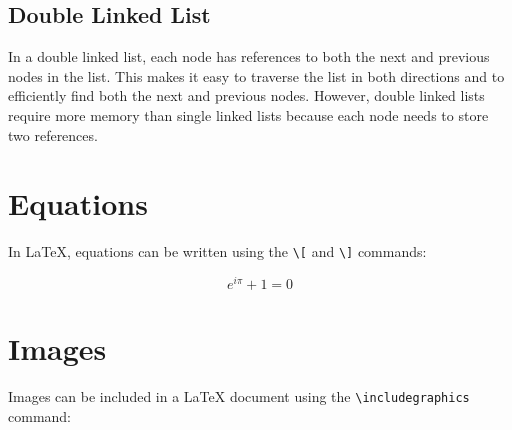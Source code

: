 \documentclass{article}
\begin{document}
\newpage
\subsection[short]{Double Linked List}


In a double linked list, each node has references to both the next and previous nodes in the list. This makes it easy to traverse the list in both directions and to efficiently find both the next and previous nodes. However, double linked lists require more memory than single linked lists because each node needs to store two references.


\section{Equations}
In LaTeX, equations can be written using the \verb|\[| and \verb|\]| commands:

\[ e^{i\pi} + 1 = 0 \]

\section{Images}
Images can be included in a LaTeX document using the \verb|\includegraphics| command:

\begin{figure}
\centering
\end{figure}
\end{document}
